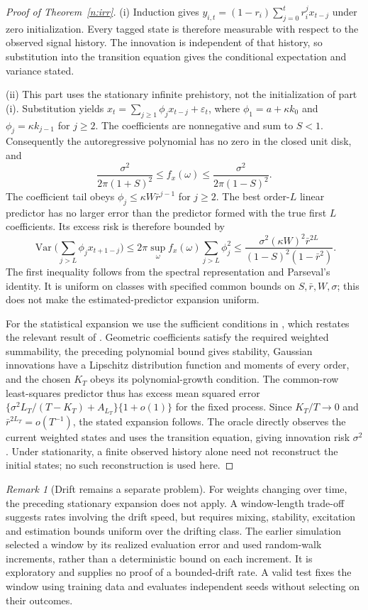 \documentclass[12pt]{article}
\theoremstyle{definition}
\theoremstyle{remark}
\newtheorem{remark}[theorem]{Remark}
\begin{document}
\begin{proof}[Proof of Theorem~\ref{n:irr}]
(i) Induction gives $y_{i,t}=(1-r_i)\sum_{j=0}^t r_i^j x_{t-j}$ under zero initialization. Every tagged state is therefore measurable with respect to the observed signal history. The innovation is independent of that history, so substitution into the transition equation gives the conditional expectation and variance stated.

(ii) This part uses the stationary infinite prehistory, not the initialization of part (i). Substitution yields
$x_t=\sum_{j\ge1}\phi_jx_{t-j}+\varepsilon_t$,
where $\phi_1=a+\kappa k_0$ and $\phi_j=\kappa k_{j-1}$ for $j\ge2$. The coefficients are nonnegative and sum to $S<1$. Consequently the autoregressive polynomial has no zero in the closed unit disk, and
\[
\frac{\sigma^2}{2\pi(1+S)^2}\le f_x(\omega)
\le\frac{\sigma^2}{2\pi(1-S)^2}.
\]
The coefficient tail obeys $\phi_j\le\kappa W\bar r^{j-1}$ for $j\ge2$. The best order-$L$ linear predictor has no larger error than the predictor formed with the true first $L$ coefficients. Its excess risk is therefore bounded by
\[
\operatorname{Var}\Big(\sum_{j>L}\phi_jx_{t+1-j}\Big)
\le 2\pi\sup_\omega f_x(\omega)\sum_{j>L}\phi_j^2
\le\frac{\sigma^2(\kappa W)^2\bar r^{2L}}{(1-S)^2(1-\bar r^2)}.
\]
The first inequality follows from the spectral representation and Parseval's identity. It is uniform on classes with specified common bounds on $S,\bar r,W,\sigma$; this does not make the estimated-predictor expansion uniform.

For the statistical expansion we use the sufficient conditions in \citet[Section~2, Proposition~2]{ingwei2005}, which restates the relevant result of \citet{ingwei2003}. Geometric coefficients satisfy the required weighted summability, the preceding polynomial bound gives stability, Gaussian innovations have a Lipschitz distribution function and moments of every order, and the chosen $K_T$ obeys its polynomial-growth condition. The common-row least-squares predictor thus has excess mean squared error
$\{\sigma^2 L_T/(T-K_T)+A_{L_T}\}\{1+o(1)\}$
for the fixed process. Since $K_T/T\to0$ and $\bar r^{2L_T}=o(T^{-1})$, the stated expansion follows. The oracle directly observes the current weighted states and uses the transition equation, giving innovation risk $\sigma^2$. Under stationarity, a finite observed history alone need not reconstruct the initial states; no such reconstruction is used here.
\end{proof}

\begin{remark}[Drift remains a separate problem]
For weights changing over time, the preceding stationary expansion does not apply. A window-length trade-off suggests rates involving the drift speed, but requires mixing, stability, excitation and estimation bounds uniform over the drifting class. The earlier simulation selected a window by its realized evaluation error and used random-walk increments, rather than a deterministic bound on each increment. It is exploratory and supplies no proof of a bounded-drift rate. A valid test fixes the window using training data and evaluates independent seeds without selecting on their outcomes.
\end{remark}
\end{document}
